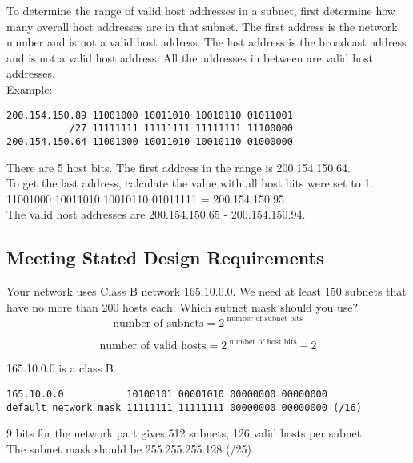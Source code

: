 To determine the range of valid host addresses in a subnet, first determine
how many overall host addresses are in that subnet. The first address is the
network number and is not a valid host address. The last address is the
broadcast address and is not a valid host address. All the addresses in
between are valid host addresses.\\

Example:

\begin{verbatim}
200.154.150.89 11001000 10011010 10010110 01011001
           /27 11111111 11111111 11111111 11100000
200.154.150.64 11001000 10011010 10010110 01000000
\end{verbatim}

There are 5 host bits. The first address in the range is 200.154.150.64.\\

To get the last address, calculate the value with all host bits were set to 1.\\

11001000 10011010 10010110 01011111 = 200.154.150.95\\

The valid host addresses are 200.154.150.65 - 200.154.150.94.

\subsection{Meeting Stated Design Requirements}

Your network uses Class B network 165.10.0.0. We need at least 150 subnets
that have no more than 200 hosts each. Which subnet mask should you use?\\

\begin{equation}
\mbox{number of subnets} = 2 ^{\mbox{ number of subnet bits}}
\end{equation}

\begin{equation}
\mbox{number of valid hosts} = 2 ^{\mbox{ number of host bits}} - 2
\end{equation}

165.10.0.0 is a class B.

\begin{verbatim}
165.10.0.0           10100101 00001010 00000000 00000000
default network mask 11111111 11111111 00000000 00000000 (/16)
\end{verbatim}

9 bits for the network part gives 512 subnets, 126 valid hosts per subnet.\\

The subnet mask should be 255.255.255.128 (/25).
